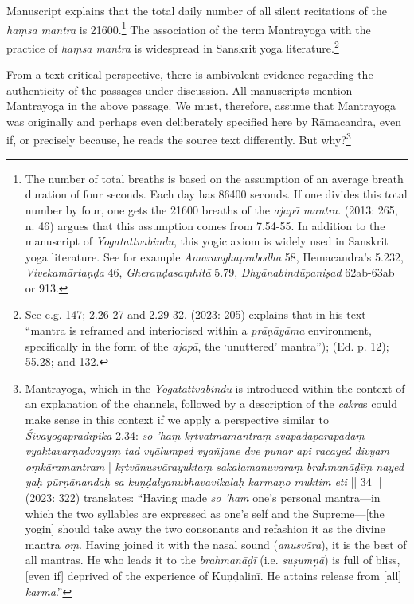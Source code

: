 Manuscript  explains that the total daily number of all silent recitations of the \textit{haṃsa mantra} is 21600.\footnote{The number of total breaths is based on the assumption of an average breath duration of four seconds. Each day has 86400 seconds. If one divides this total number by four, one gets the 21600 breaths of the \textit{ajapā mantra}. \citeauthor{birch2013} (2013: 265, n. 46) argues that this assumption comes from  7.54-55. In addition to the  manuscript of \textit{Yogatattvabindu}, this yogic axiom is widely used in Sanskrit yoga literature. See for example \textit{Amaraughaprabodha} 58, Hemacandra's  5.232, \textit{Vivekamārtaṇḍa} 46, \textit{Gheraṇḍasaṃhitā} 5.79, \textit{Dhyānabindūpaniṣad} 62ab-63ab or  913.} The association of the term Mantrayoga with the practice of \textit{haṃsa mantra} is widespread in Sanskrit yoga literature.\footnote{See e.g.  147;  2.26-27 and 2.29-32. \citeauthor{powell2023} (2023: 205) explains that in his text ``mantra is reframed and interiorised within a \textit{prāṇāyāma} environment, specifically in the form of the \textit{ajapā}, the `unuttered' mantra'');  (Ed. p. 12);  55.28; and  132.}

From a text-critical perspective, there is ambivalent evidence regarding the authenticity of the passages under discussion. All manuscripts mention Mantrayoga in the above passage. We must, therefore, assume that Mantrayoga was originally and perhaps even deliberately specified here by Rāmacandra, even if, or precisely because, he reads the source text differently. But why?\footnote{Mantrayoga, which in the \textit{Yogatattvabindu}  is introduced within the context of an explanation of the channels, followed by a description of the \textit{cakra}s could make sense in this context if we apply a perspective similar to \emph{Śivayogapradīpikā} 2.34: \textit{so 'haṃ kṛtvātmamantraṃ svapadaparapadaṃ vyaktavarṇadvayaṃ tad vyālumped vyañjane dve punar api racayed divyam oṃkāramantram} | \textit{kṛtvānusvārayuktaṃ sakalamanuvaraṃ brahmanāḍīṃ nayed yaḥ pūrṇānandaḥ sa kuṇḍalyanubhavavikalaḥ karmaṇo muktim eti} || 34 || \citeauthor{powell2023} (2023: 322) translates: ``Having made \textit{so ’ham} one’s personal mantra—in which the two syllables are expressed as one's self and the Supreme—[the yogin] should take away the two consonants and refashion it as the divine mantra \textit{oṃ}. Having joined it with the nasal sound (\textit{anusvāra}), it is the best of all mantras. He who leads it to the \textit{brahmanāḍī} (i.e. \textit{suṣumṇā}) is full of bliss, [even if] deprived of the experience of Kuṇḍalinī. He attains release from [all] \textit{karma}.''} 

